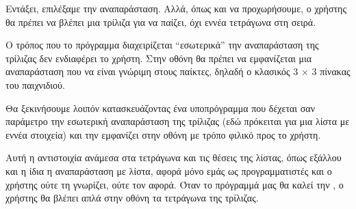 \documentclass[a4paper,11pt,oneside]{book}
\begin{document}
\begin{question}
Εντάξει, επιλέξαμε την αναπαράσταση. Αλλά, όπως και να προχωρήσουμε, ο χρήστης θα πρέπει να βλέπει μια τρίλιζα για να παίζει, όχι εννέα τετράγωνα στη σειρά.
\end{question}

Ο τρόπος που το πρόγραμμα διαχειρίζεται ``εσωτερικά'' την αναπαράσταση της τρίλιζας δεν ενδιαφέρει το χρήστη. Στην οθόνη θα πρέπει να εμφανίζεται μια αναπαράσταση που να είναι γνώριμη στους παίκτες, δηλαδή ο κλασικός 3 $\times$ 3 πίνακας του παιχνιδιού. 

Θα ξεκινήσουμε λοιπόν κατασκευάζοντας ένα υποπρόγραμμα που δέχεται σαν παράμετρο την εσωτερική αναπαράσταση  της τρίλιζας (εδώ πρόκειται για μια λίστα με εννέα στοιχεία) και την εμφανίζει στην οθόνη με τρόπο φιλικό προς το χρήστη.



Αυτή η αντιστοιχία ανάμεσα στα τετράγωνα και τις θέσεις της λίστας, όπως εξάλλου και η ίδια η αναπαράσταση με λίστα, αφορά μόνο εμάς ως προγραμματιστές και ο χρήστης ούτε τη γνωρίζει, ούτε τον αφορά. Όταν το πρόγραμμά μας θα καλεί την , ο χρήστης θα βλέπει απλά στην οθόνη τα τετράγωνα της τρίλιζας. 
\end{document}
